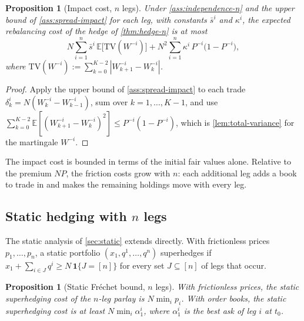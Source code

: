 \documentclass[11pt,a4paper]{article}
\theoremstyle{plain}
\newtheorem{proposition}[theorem]{Proposition}
\theoremstyle{definition}
\theoremstyle{remark}
\newcommand{\E}{\mathbb{E}}
\newcommand{\1}{\mathbf{1}}
\begin{document}
\begin{proposition}[Impact cost, $n$ legs]
\label{prop:impact-n}
Under \cref{ass:independence-n} and the upper bound of \cref{ass:spread-impact} for each leg, with constants $\bar s^i$ and $\kappa^i$, the expected rebalancing cost of the hedge of \cref{thm:hedge-n} is at most
\[
N\sum_{i=1}^n\bar s^i\,\E\bigl[\mathrm{TV}(W^{-i})\bigr] + N^2\sum_{i=1}^n\kappa^i\,P^{-i}\bigl(1-P^{-i}\bigr),
\]
where $\mathrm{TV}(W^{-i}) := \sum_{k=0}^{K-2}|W^{-i}_{k+1}-W^{-i}_k|$.
\end{proposition}

\begin{proof}
Apply the upper bound of \cref{ass:spread-impact} to each trade $\delta^i_k = N(W^{-i}_k-W^{-i}_{k-1})$, sum over $k=1,\dots,K-1$, and use $\sum_{k=0}^{K-2}\E[(W^{-i}_{k+1}-W^{-i}_k)^2]\leq P^{-i}(1-P^{-i})$, which is \cref{lem:total-variance} for the martingale $W^{-i}$.
\end{proof}

The impact cost is bounded in terms of the initial fair values alone. Relative to the premium $NP$, the friction costs grow with $n$: each additional leg adds a book to trade in and makes the remaining holdings move with every leg.

\subsection{Static hedging with \texorpdfstring{$n$}{n} legs}

The static analysis of \cref{sec:static} extends directly. With frictionless prices $p_1,\dots,p_n$, a static portfolio $(x_1,q^1,\dots,q^n)$ superhedges if $x_1 + \sum_{i\in J}q^i\geq N\,\1\{J=[n]\}$ for every set $J\subseteq[n]$ of legs that occur.

\begin{proposition}[Static Fréchet bound, $n$ legs]
\label{prop:frechet-n}
With frictionless prices, the static superhedging cost of the $n$-leg parlay is $N\min_ip_i$. With order books, the static superhedging cost is at least $N\min_i\alpha^i_1$, where $\alpha^i_1$ is the best ask of leg $i$ at $t_0$.
\end{proposition}
\end{document}

